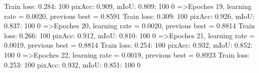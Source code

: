 Train loss: 0.284: 100%
pixAcc: 0.909, mIoU: 0.809: 100%
  0%
=>Epoches 19, learning rate = 0.0020,                 previous best = 0.8591
Train loss: 0.309: 100%
pixAcc: 0.926, mIoU: 0.837: 100%
  0%
=>Epoches 20, learning rate = 0.0020,                 previous best = 0.8814
Train loss: 0.266: 100%
pixAcc: 0.912, mIoU: 0.810: 100%
  0%
=>Epoches 21, learning rate = 0.0019,                 previous best = 0.8814
Train loss: 0.254: 100%
pixAcc: 0.932, mIoU: 0.852: 100%
  0%
=>Epoches 22, learning rate = 0.0019,                 previous best = 0.8923
Train loss: 0.253: 100%
pixAcc: 0.932, mIoU: 0.851: 100%
  0%
